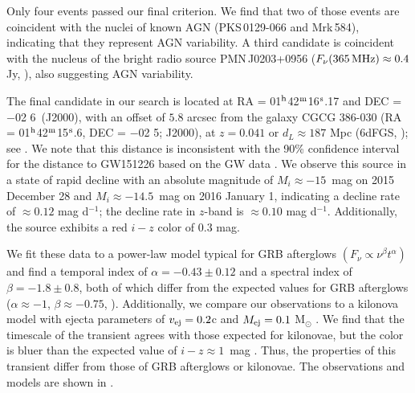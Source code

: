\clearpage
Only four events passed our final criterion. We find that two of those events are 
coincident with the nuclei of known AGN (PKS\,0129-066 and Mrk\,584), indicating 
that they represent AGN variability. A third candidate is coincident with the nucleus of
the bright radio source PMN\,J0203+0956 ($F_\nu(365\,{\rm MHz})\approx 0.4$ Jy, 
\citealt{Douglas+96}), also suggesting AGN variability.

The final candidate in our search is located at RA = 01$^{\rm h}$42$^{\rm m}$16$^{\rm s}$.17 
and DEC = $-$02 6\arcsec~(J2000), with an offset of $5.8$ arcsec from the galaxy 
CGCG 386-030 (RA =  01$^{\rm h}$42$^{\rm m}$15$^{\rm s}$.6, DEC = $-$02 
5\arcsec; J2000), at $z = 0.041$ or $d_L \approx 187$ Mpc (6dFGS, \citealt{Jones+04,Jones+09}); see 
. We note that this distance is inconsistent with the 90\% confidence interval for
the distance to GW151226 based on the GW data \citep{LIGOGW151226}. We observe this source in a state of rapid decline with an 
absolute magnitude of $M_i \approx -15$~mag on 2015 December 28 and $M_i\approx -14.5$~mag on 2016 
January 1, indicating a decline rate of $\approx 0.12$ mag d$^{-1}$; the decline rate in $z$-band is 
$\approx 0.10$ mag d$^{-1}$. Additionally, the source exhibits a red $i-z$ color of $0.3$ mag. 

We fit these data to a power-law model typical for GRB afterglows $(F_\nu \propto \nu^{\beta} t^{\alpha})$ 
and find a temporal index of $\alpha = -0.43\pm0.12$ and a spectral index of $\beta = -1.8\pm0.8$, 
both of which differ from the expected values for GRB afterglows ($\alpha \approx -1$, 
$\beta \approx -0.75$, \citealt{Sari+98}). Additionally, we compare our observations to a 
kilonova model with ejecta parameters of $v_{\rm ej} = 0.2$c and $M_{\rm ej} = 0.1$ M$_\odot$
\citep{BarnesKasen13}. We find that the timescale of the transient agrees with those expected for kilonovae, 
but the color is bluer than the expected value of $i-z \approx 1$~mag \citep{BarnesKasen13}. Thus, the properties
of this transient differ from those of GRB afterglows or kilonovae. The observations 
and models are shown in .

